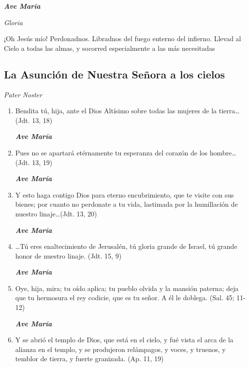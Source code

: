 \documentclass[a4paper,11pt, oneside]{report}
\begin{document}
      \textbf{\textit{Ave María}} \par
      \indent\textit{Gloria} \par
      \indent¡Oh Jesús mío! Perdonadnos. Libradnos del fuego enterno del infierno. Llevad al Cielo a todas las almas, y socorred especialmente a las más 
      necesitadas

    \subsection*{ La Asunción de Nuestra Señora a los cielos }

      \textit{Pater Noster}

      \begin{enumerate}

        \item Bendita tú, hija, ante el Dios Altísimo sobre todas las mujeres de la tierra\ldots (Jdt. 13, 18)

        \textbf{\textit{Ave María}}

        \item Pues no se apartará etérnamente tu esperanza del corazón de los hombre\ldots (Jdt. 13, 19)

        \textbf{\textit{Ave María}}

        \item Y esto haga contigo Dios para eterno encubrimiento, que te visite con sus bienes; por cuanto no perdonate
        a tu vida, lastimada por la humillación de nuestro linaje\ldots (Jdt. 13, 20)

        \textbf{\textit{Ave María}}

        \item {\ldots}Tú eres enaltecimiento de Jerusalén, tú gloria grande de Israel, tú grande honor de nuestro linaje. (Jdt. 15, 9)

        \textbf{\textit{Ave María}}

        \item Oye, hija, mira; tu oído aplica; tu pueblo olvida y la mansión paterna; deja que tu hermosura
        el rey codicie, que es tu señor. A él le doblega. (Sal. 45; 11-12)

        \textbf{\textit{Ave María}}

        \item Y se abrió el templo de Dios, que está en el cielo, y fué vista el arca de la alianza en el templo,
        y se produjeron relámpagos, y voces, y truenos, y temblor de tierra, y fuerte granizada. (Ap. 11, 19)


\end{enumerate}
\end{document}
